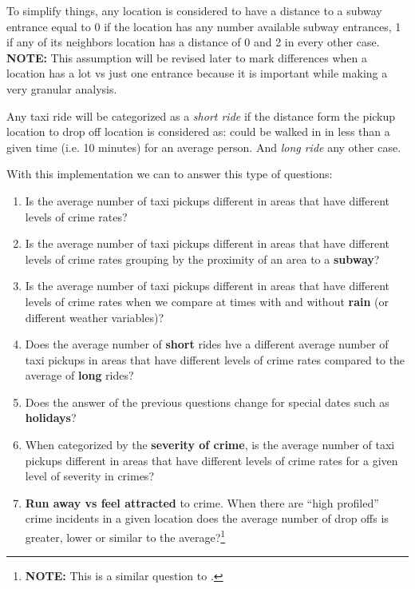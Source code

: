 \documentclass{sigkddExp}
\begin{document}
To simplify things, any location is considered to have a  distance to a subway entrance equal to 0 if the location has any number available subway entrances,  1 if any of its neighbors location has a distance of 0 and 2 in every other case. \textbf{NOTE:} This assumption will be revised later to mark differences when a location has a lot vs just one entrance because it is important while making a very granular analysis.


Any taxi ride will be categorized as a \textit{short ride} if the distance form the pickup location to drop off location is considered as: could be walked in in less than a given time (i.e. 10 minutes) for an average person. And \textit{long ride} any other case.

With this implementation we  can to answer this type of questions:
\begin{enumerate}
       \item Is the average number of taxi pickups different in areas that have different levels of crime rates?

       \item Is the average number of taxi pickups different in areas that have different levels of crime rates grouping by the proximity of an area to a \textbf{subway}? 

       \item Is the average number of taxi pickups different in areas that have different levels of crime rates when we compare at times with and without \textbf{rain} (or different weather variables)?

       \item Does the average  number of \textbf{short} rides hve a different average number of taxi pickups  in areas that have different levels of crime rates  compared to the average of \textbf{long} rides?

       \item Does the answer of the previous questions change for special dates such as \textbf{holidays}?

       \item When categorized by the \textbf{severity of crime}, is the average number of taxi pickups different in areas that have different levels of crime rates for a given level of severity in crimes?

       \item \textbf{Run away vs feel attracted} to crime. When there are ``high profiled'' crime incidents in a given location does the average number of drop offs is greater, lower or similar to the average?\footnote{\textbf{NOTE:} This is a similar question to \cite{Bendler14}.}


\end{enumerate}
\end{document}

